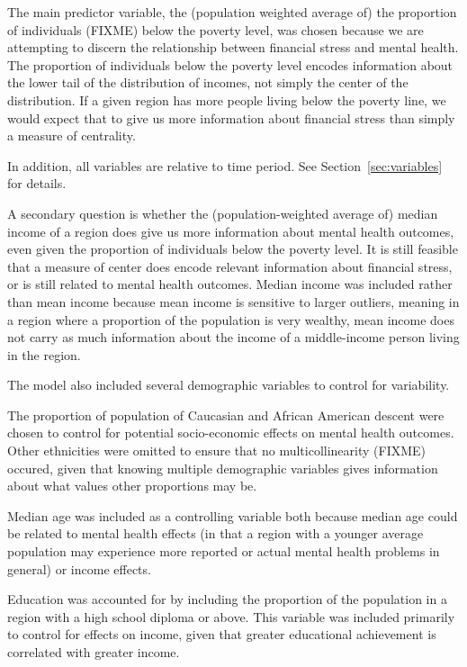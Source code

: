 \documentclass{article}
\begin{document}
The main predictor variable, the (population weighted average of) the
proportion of individuals (FIXME) below the poverty level, was chosen
because we are attempting to discern the relationship between financial
stress and mental health. The proportion of individuals below the
poverty level encodes information about the lower tail of the
distribution of incomes, not simply the center of the distribution.
If a given region has more people living below the poverty line, we
would expect that to give us more information about financial stress
than simply a measure of centrality.

In addition, all variables are relative to time period.
See Section~\ref{sec:variables} for details.

A secondary question is whether the (population-weighted average of)
median income of a region does give us more information about mental
health outcomes, even given the proportion of individuals below the
poverty level. It is still feasible that a measure of center does encode
relevant information about financial stress, or is still related to
mental health outcomes. Median income was included rather than mean
income because mean income is sensitive to larger outliers, meaning in a
region where a proportion of the population is very wealthy, mean income
does not carry as much information about the income of a middle-income person
living in the region.

The model also included several demographic variables to control for
variability.

The proportion of population of Caucasian and African
American descent were chosen to control for potential socio-economic
effects on mental health outcomes. Other ethnicities were omitted to
ensure that no multicollinearity (FIXME) occured, given that knowing
multiple demographic variables gives information about what values other
proportions may be.

Median age was included as a controlling variable
both because median age could be related to mental health effects (in
that a region with a younger average population may experience more
reported or actual mental health problems in general) or income effects.

Education was accounted for by including the proportion of the
population in a region with a high school diploma or above. This
variable was included primarily to control for effects on income, given
that greater educational achievement is correlated with greater income.
\end{document}
